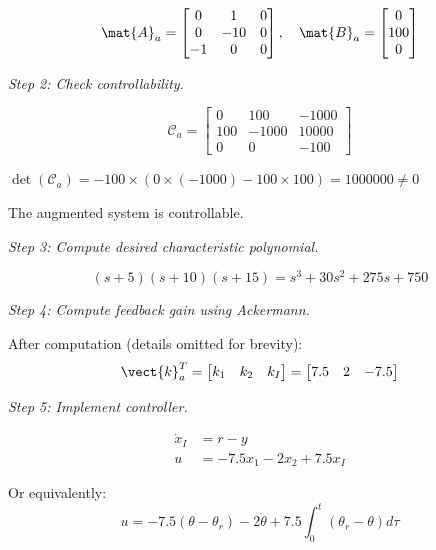 \begin{equation}
\mat{A}_a = \begin{bmatrix} 0 & 1 & 0 \\ 0 & -10 & 0 \\ -1 & 0 & 0 \end{bmatrix}, \quad
\mat{B}_a = \begin{bmatrix} 0 \\ 100 \\ 0 \end{bmatrix}
\end{equation}

\textit{Step 2: Check controllability.}

\begin{equation}
\mathcal{C}_a = \begin{bmatrix} 0 & 100 & -1000 \\ 100 & -1000 & 10000 \\ 0 & 0 & -100 \end{bmatrix}
\end{equation}

$\det(\mathcal{C}_a) = -100 \times (0 \times (-1000) - 100 \times 100) = 1000000 \neq 0$

The augmented system is controllable.

\textit{Step 3: Compute desired characteristic polynomial.}

\begin{equation}
(s+5)(s+10)(s+15) = s^3 + 30s^2 + 275s + 750
\end{equation}

\textit{Step 4: Compute feedback gain using Ackermann.}

After computation (details omitted for brevity):
\begin{equation}
\vect{k}_a^T = \begin{bmatrix} k_1 & k_2 & k_I \end{bmatrix} = \begin{bmatrix} 7.5 & 2 & -7.5 \end{bmatrix}
\end{equation}

\textit{Step 5: Implement controller.}

\begin{align}
\dot{x}_I &= r - y \\
u &= -7.5x_1 - 2x_2 + 7.5x_I
\end{align}

Or equivalently:
\begin{equation}
u = -7.5(\theta - \theta_r) - 2\dot{\theta} + 7.5\int_0^t (\theta_r - \theta) d\tau
\end{equation}


